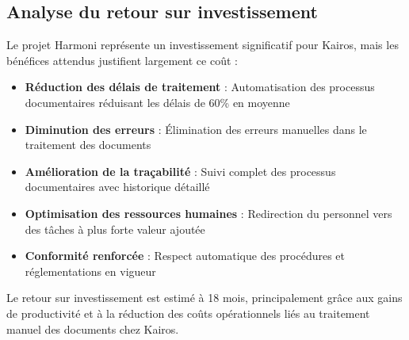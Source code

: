 \subsection{Analyse du retour sur investissement}

Le projet Harmoni représente un investissement significatif pour Kairos, mais les bénéfices attendus justifient largement ce coût :

\begin{itemize}[label=, font=\large \color{listGreen}]
    \item \textbf{Réduction des délais de traitement} : Automatisation des processus documentaires réduisant les délais de 60\% en moyenne
    \item \textbf{Diminution des erreurs} : Élimination des erreurs manuelles dans le traitement des documents
    \item \textbf{Amélioration de la traçabilité} : Suivi complet des processus documentaires avec historique détaillé
    \item \textbf{Optimisation des ressources humaines} : Redirection du personnel vers des tâches à plus forte valeur ajoutée
    \item \textbf{Conformité renforcée} : Respect automatique des procédures et réglementations en vigueur
\end{itemize}

Le retour sur investissement est estimé à 18 mois, principalement grâce aux gains de productivité et à la réduction des coûts opérationnels liés au traitement manuel des documents chez Kairos.